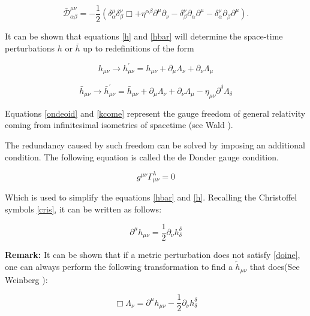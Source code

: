 \begin{equation}\label{Dbar}
\bar{\mathcal{D}}^{\mu\nu}_{\alpha \beta} = -\frac{1}{2}( \delta^{\mu}_{\alpha} \delta^{\nu}_{\beta} \Box + \eta^{\alpha \beta}\partial^{\mu}\partial_{\nu} - \delta^{\nu}_{\beta} \partial_{\alpha}\partial^{\mu} - \delta^{\nu}_{\alpha} \partial_{\beta}\partial^{\mu}).
\end{equation}


It can be shown that equations \ref{h} and \ref{hbar} will determine the space-time perturbations $h$ or $\bar{h}$ up to redefinitions of the form

\begin{equation}\label{ondeoid}
h_{\mu\nu} \rightarrow  h^{'}_{\mu\nu} = h_{\mu\nu} + \partial_{\mu} \Lambda_{\nu} + \partial_{\nu} \Lambda_{\mu} 
\end{equation}


\begin{equation}\label{kcome}
\bar{h}_{\mu\nu} \rightarrow  \bar{h}^{'}_{\mu\nu} = \bar{h}_{\mu\nu} + \partial_{\mu} \Lambda_{\nu} + \partial_{\nu} \Lambda_{\mu} - \eta_{\mu\nu} \partial^{\delta} \Lambda_{\delta}
\end{equation}

Equations \ref{ondeoid} and \ref{kcome} represent the gauge freedom of general relativity coming from infinitesimal isometries of spacetime (see Wald \cite[chapter X]{Wald:1984rg}). 

The redundancy caused by such freedom can be solved by imposing an additional condition. The following equation is called the de Donder gauge condition.

\begin{equation}
g^{\mu\nu} \Gamma^{\lambda}_{\mu\nu} = 0
\end{equation}

Which is used to simplify the equations \ref{hbar} and \ref{h}. Recalling the Christoffel symbols \ref{cris}, it can be written as follows:  

\begin{equation}\label{doine}
\partial^{\mu} h_{\mu\nu} = \frac{1}{2} \partial_{\nu} h^{\delta}_{\delta}
\end{equation}

\textbf{Remark:} It can be shown that if a metric perturbation does not satisfy \ref{doine}, one can always perform the following transformation to find a $\tilde{h}_{\mu\nu}$ that does(See Weinberg \cite[chapter 10]{Weinberg:1972kfs}):

\begin{equation}
\Box \Lambda_\nu = \partial^{\mu} h_{\mu\nu} - \frac{1}{2} \partial_{\nu} h^{\delta}_{\delta}
\end{equation} 

